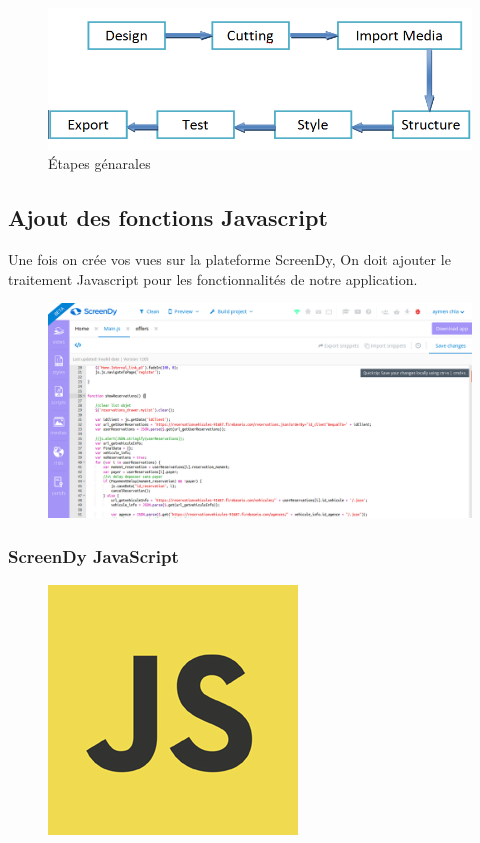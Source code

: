 \documentclass[12pt,a4paper]{report}
\begin{document}
		
			\begin{figure}[!hbtp]
				\centering
				\includegraphics[scale=0.5]{./graphics/general-steps.png}
				\caption{\'Etapes génarales}
			\end{figure}




		\subsection{Ajout des fonctions Javascript}
Une fois on crée vos vues sur la plateforme ScreenDy, On doit ajouter le traitement Javascript pour les fonctionnalités de notre application.
			\begin{figure}[!hbtp]
			\centering
			\includegraphics[scale=0.3]{./graphics/js_screendy.png}
			\end{figure}

			\subsubsection{ScreenDy JavaScript}
			\begin{figure}
			\includegraphics[scale=0.5]{./graphics/js.png}
			\end{figure}
\end{document}
